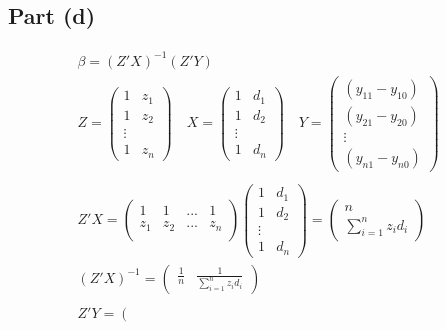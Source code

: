 \documentclass[12pt, a4paper]{article}
\begin{document}
\subsection*{Part (d)}
\begin{align*}
    &\beta = (Z'X)^{-1}(Z'Y)\\
    &Z = \left(\begin{array}{cc}
        1&z_1\\
        1&z_2\\
        \vdots\\
        1&z_n
    \end{array}\right)\quad
    X = \left(\begin{array}{cc}
        1&d_1\\
        1&d_2\\
        \vdots\\
        1&d_n
    \end{array}\right)\quad
    Y = \left(\begin{array}{c}
        (y_{11} - y_{10})\\
        (y_{21} - y_{20})\\
        \vdots\\
        (y_{n1} - y_{n0})
    \end{array}\right)\quad\\\\
    &Z'X = 
    \left(\begin{array}{cccc}
        1&1&...&1\\
        z_1&z_2&...&z_n\\
    \end{array}\right)
    \left(\begin{array}{cc}
        1&d_1\\
        1&d_2\\
        \vdots\\
        1&d_n
    \end{array}\right) =
    \left(\begin{array}{c}
        n\\
        \sum_{i=1}^nz_id_i
    \end{array}\right)\\
    &(Z'X)^{-1} = 
    \left(\begin{array}{cc}
        \frac{1}{n}&\frac{1}{\sum_{i=1}^nz_id_i}
    \end{array}\right)\\\\
    &Z'Y = 
    \left(\begin{array}{cccc}

\end{array}
\end{align*}
\end{document}
